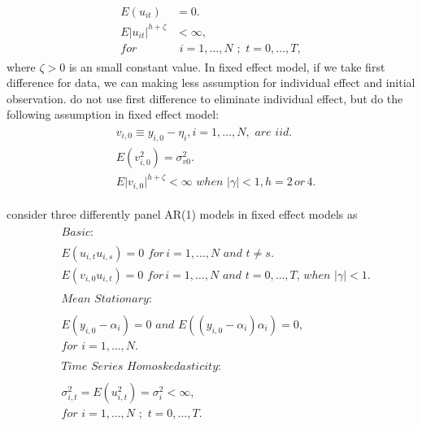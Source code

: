 \documentclass[12pt,a4paper,hyperref]{article}
\begin{document}
\begin{align}
\begin{split}
E(u_{it})&=0. \\
E\vert u_{it} \vert^{h+\zeta}&<\infty , \\
 for & \,\,i=1,\ldots, N \,\, ; \,\, t=0,\ldots, T,
 \end{split}
\end{align}
where $\zeta>0$ is an small constant value.
In fixed effect model, if we take first difference for data, we can making less assumption for individual effect and initial observation. \citet{Kruiniger:2013} do not use first difference to eliminate individual effect, but \citet{Kruiniger:2013} do the following assumption in fixed effect model:
\begin{align}
\begin{split}
&v_{i,0}\equiv y_{i,0}-\eta_{i}, i=1,\ldots, N, \,\, are \,\,iid.\\
&E(v_{i,0}^{2})=\sigma_{v0}^{2}. \\
&E\vert v_{i,0} \vert^{h+\zeta}<\infty \,\, when \,\, \vert \gamma \vert<1, h=2 \,or\,4.
\end{split}
\end{align}

\citet{Kruiniger:2013} consider three differently panel AR(1) models in fixed effect models as
\begin{align*}
\begin{split}
&Basic:  \\ \\
&E ( u_{i,t}u_{i,s} ) = 0 \,\, for \, i=1,\ldots, N \,\, and \,\, t \neq s. \\
&E ( v_{i,0} u_{i,t} )= 0 \,\, for\, i=1,\ldots, N \,\,and\,\, t=0,\ldots, T,\, when \,\, \vert \gamma \vert <1.
\\ \\
&Mean \,\, Stationary: \\ \\
&E ( y_{i,0}-\alpha_{i})=0 \,\, and \,\, E((y_{i,0}-\alpha_{i})\alpha_{i})=0, \\
 &for \,\, i=1,\ldots, N.
\\ \\
&Time \,\, Series \,\, Homoskedasticity: \\ \\
&\sigma^{2}_{i,t}=E(u^{2}_{i,t})=\sigma^{2}_{i}<\infty, \\
&for \,\, i=1,\ldots, N \,\,;\,\, t=0,\ldots, T.
\end{split}
\end{align*}
\end{document}
